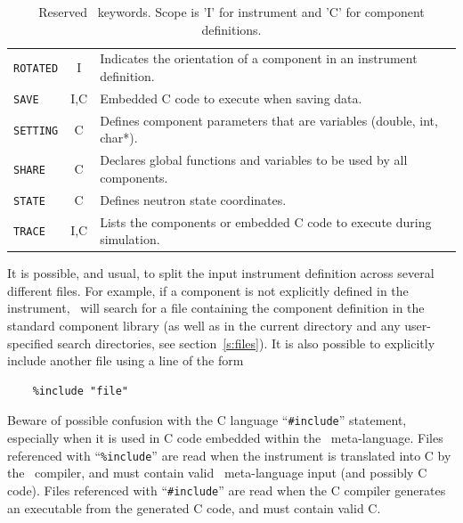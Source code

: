 \begin{table}
\begin{center}
{\begin{tabular}{|l|c|p{}|}
      \texttt{ROTATED} & I & Indicates the orientation of a component in an instrument definition. \\
      \texttt{SAVE} & I,C & Embedded C code to execute when saving data. \\
      \texttt{SETTING} & C & Defines component parameters that are
      variables (double, int, char*). \\
      \texttt{SHARE} & C & Declares global functions and variables to be used by all components. \\
      \texttt{STATE} & C & Defines neutron state coordinates. \\
      \texttt{TRACE} & I,C & Lists the components or embedded C code to execute during simulation. \\
      \hline
    \end{tabular}
    \caption{Reserved \MCS\ keywords. 
    Scope is 'I' for instrument and 'C' for component definitions.}
    \label{t:keywords}
    }
  \end{center}
\end{table}

It is possible, and usual, to split the input instrument definition
across several different files. For example, if a component is not
explicitly defined in the instrument,
\MCS\ will search for a file containing the component definition in the
standard component library (as well as in the current directory and any
user-specified search directories, see section~\ref{s:files}). It is
also possible to explicitly include another file using a line of the
form 
\begin{verbatim}
    %include "file"
\end{verbatim}
Beware of possible confusion with the C language ``\verb+#include+''
statement, especially when it is used in C code embedded within the
\MCS\ meta-language. Files referenced with ``\verb+%include+'' are read
when the instrument is translated into C by the \MCS\ compiler, and must
contain valid \MCS\ meta-language input (and possibly C code). Files referenced with
``\verb+#include+'' are read when the C compiler generates an
executable from the generated C code, and must contain valid C.

